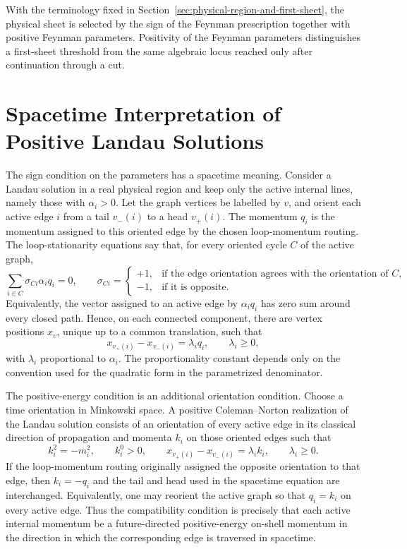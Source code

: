 With the terminology fixed in
Section~\ref{sec:physical-region-and-first-sheet}, the physical sheet is
selected by the sign of the Feynman prescription together with positive
Feynman parameters.  Positivity of the Feynman parameters distinguishes a
first-sheet threshold from the same algebraic locus reached only after
continuation through a cut.

\section{Spacetime Interpretation of Positive Landau Solutions}

The sign condition on the parameters has a spacetime meaning.  Consider a
Landau solution in a real physical region and keep only the active internal
lines, namely those with \(\alpha_i>0\).  Let the graph vertices be labelled
by \(v\), and orient each active edge \(i\) from a tail \(v_-(i)\) to a head
\(v_+(i)\).  The momentum \(q_i\) is the momentum assigned to this oriented
edge by the chosen loop-momentum routing.  The loop-stationarity equations say
that, for every oriented cycle \(C\) of the active graph,
\[
  \sum_{i\in C}\sigma_{Ci}\alpha_i q_i=0,\qquad
  \sigma_{Ci}=
  \begin{cases}
    +1,&\text{if the edge orientation agrees with the orientation of }C,\\
    -1,&\text{if it is opposite.}
  \end{cases}
\]
Equivalently, the vector assigned to an active edge by \(\alpha_i q_i\) has
zero sum around every closed path.  Hence, on each connected component, there
are vertex positions \(x_v\), unique up to a common translation, such that
\[
  x_{v_+(i)}-x_{v_-(i)}=\lambda_i q_i,
  \qquad
  \lambda_i\ge0 ,
\]
with \(\lambda_i\) proportional to \(\alpha_i\).  The proportionality constant
depends only on the convention used for the quadratic form in the parametrized
denominator.

The positive-energy condition is an additional orientation condition.  Choose a
time orientation in Minkowski space.  A positive Coleman--Norton realization of
the Landau solution consists of an orientation of every active edge in its
classical direction of propagation and momenta \(k_i\) on those oriented edges
such that
\begin{equation}
  k_i^2=-m_i^2,\qquad k_i^0>0,\qquad
  x_{v_+(i)}-x_{v_-(i)}=\lambda_i k_i,\qquad
  \lambda_i\ge0 .
  \label{eq:positive-coleman-norton-realization}
\end{equation}
If the loop-momentum routing originally assigned the opposite orientation to
that edge, then \(k_i=-q_i\) and the tail and head used in the spacetime
equation are interchanged.  Equivalently, one may reorient the active graph so
that \(q_i=k_i\) on every active edge.  Thus the compatibility condition is
precisely that each active internal momentum be a future-directed
positive-energy on-shell momentum in the direction in which the corresponding
edge is traversed in spacetime.

